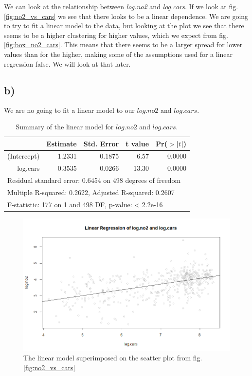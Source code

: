 \documentclass[a4paper,norsk, 10pt]{article}
\begin{document}
We can look at the relationship between \textit{log.no2} and \textit{log.cars}. If we look at fig. \ref{fig:no2_vs_cars} we see that there looks to be a linear dependence. We are going to try to fit a linear model to the data, but looking at the plot we see that there seems to be a higher clustering for higher values, which we expect from fig. \ref{fig:box_no2_cars}. This means that there seems to be a larger spread for lower values than for the higher, making some of the assumptions used for a linear regression false. We will look at that later.



\subsection*{b)}

We are no going to fit a linear model to our $log.no2$ and $log.cars$.


\begin{table}[!htbp]
\centering
\begin{tabular}{rrrrr}
  \hline
 & Estimate & Std. Error & t value & Pr($>$|$t$|) \\ 
  \hline
(Intercept) & 1.2331 & 0.1875 & 6.57 & 0.0000 \\ 
  log.cars & 0.3535 & 0.0266 & 13.30 & 0.0000 \\ 
   \hline
   \multicolumn{5}{l}{Residual standard error: 0.6454 on 498 degrees of freedom} \\
   \multicolumn{5}{l}{Multiple R-squared:  0.2622,	Adjusted R-squared:  0.2607} \\
   \multicolumn{5}{l}{F-statistic:   177 on 1 and 498 DF,  p-value: < 2.2e-16} \\ \hline
\end{tabular}
\caption{Summary of the linear model for $log.no2$ and $log.cars$.}\label{tab:no2_cars_fit}
\end{table}

\begin{figure}[!htbp]
\centering
\includegraphics[scale=0.5]{no2_cars_reg.png}
\caption{The linear model superimposed on the scatter plot from fig. \ref{fig:no2_vs_cars}}\label{fig:no2_vs_cars_fit}
\end{figure}
\end{document}
